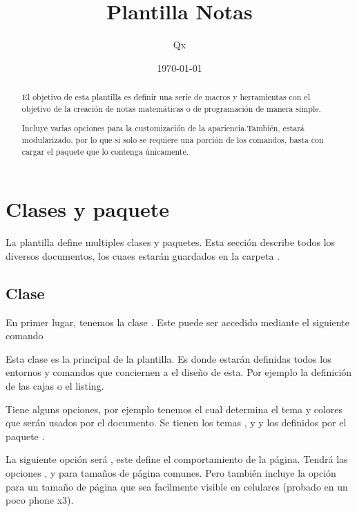 \documentclass[theme=mocha, pagecolor, pagesize=a5paper, stretchmode=true]{qx-files/qx-notes}
\title{Plantilla Notas}
\author{Qx}
\date{\today}
\begin{document}
  \maketitle




  \begin{abstract}
    El objetivo de esta plantilla es definir una serie de macros y herramientas con el objetivo de la creación de notas matemáticas o de programación de manera simple.

    Incluye varias opciones para la customización de la apariencia.También, estará modularizado, por lo que si solo se requiere una porción de los comandos, basta con cargar el paquete que lo contenga únicamente.
  \end{abstract}



  \section{Clases y paquete}

  La plantilla define multiples clases y paquetes. Esta sección describe todos los diversos documentos, los cuaes estarán guardados en la carpeta .



  \subsection{Clase }

  En primer lugar, tenemos la clase . Este puede ser accedido mediante el siguiente comando

  Esta clase es la principal de la plantilla. Es donde estarán definidas todos los entornos y comandos que conciernen a el diseño de esta. Por ejemplo la definición de las cajas o el listing.

  Tiene alguns opciones, por ejemplo tenemos  el cual determina el tema y colores que serán usados por el documento. Se tienen los temas ,  y  y los definidos por el paquete .

  La siguiente opción será , este define el comportamiento de la página. Tendrá las opciones ,  y  para tamaños de página comunes. Pero también incluye la opción  para un tamaño de página que sea facilmente visible en celulares (probado en un poco phone x3).
\end{document}
